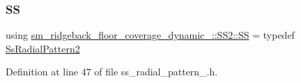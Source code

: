 \subsubsection{\texorpdfstring{SS}{SS}}
{\footnotesize\ttfamily using \hyperlink{namespacesm__ridgeback__floor__coverage__dynamic__1_1_1SS2_a4708dfdbe1e5e300cce2284bd8151560}{sm\+\_\+ridgeback\+\_\+floor\+\_\+coverage\+\_\+dynamic\+\_\+::\+S\+S2\+::\+SS} = typedef \hyperlink{structsm__ridgeback__floor__coverage__dynamic__1_1_1SS2_1_1SsRadialPattern2}{Ss\+Radial\+Pattern2}}



Definition at line 47 of file ss\+\_\+radial\+\_\+pattern\+\_.\+h.


